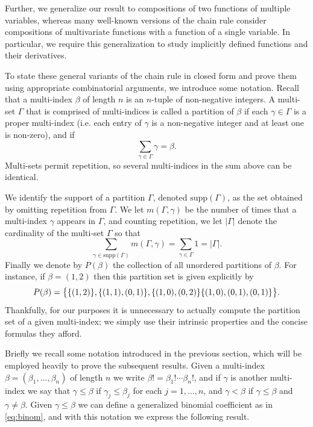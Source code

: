 \documentclass[oneside,hidelinks,indentfirst,10pt]{book}
\begin{document}
Further, we generalize our result to compositions of two functions of multiple variables, whereas many well-known versions of the chain rule consider compositions of multivariate functions with a function of a single variable. In particular, we require this generalization to study implicitly defined functions and their derivatives. 


To state these general variants of the chain rule in closed form and prove them using appropriate combinatorial arguments, we introduce some notation. Recall that a multi-index \(\beta\) of length \(n\) is an \(n\)-tuple of non-negative integers. A multi-set \(\Gamma\) that is comprised of multi-indices is called a partition of \(\beta\) if each \(\gamma\in\Gamma\) is a proper multi-index (i.e. each entry of \(\gamma\) is a non-negative integer and at least one is non-zero), and if
\[
    \sum_{\gamma\in\Gamma}\gamma=\beta.
\]
Multi-sets permit repetition, so several multi-indices in the sum above can be identical. 

We identify the support of a partition \(\Gamma\), denoted \(\mathrm{supp}(\Gamma)\), as the set obtained by omitting repetition from \(\Gamma\). We let \(m(\Gamma,\gamma)\) be the number of times that a multi-index \(\gamma\) appears in \(\Gamma\), and counting repetition, we let \(|\Gamma|\) denote the cardinality of the multi-set \(\Gamma\) so that
\[
    \sum_{\gamma\in\mathrm{supp}(\Gamma)}m(\Gamma,\gamma)=\sum_{\gamma\in\Gamma}1=|\Gamma|.
\]
Finally we denote by \(P(\beta)\) the collection of all unordered partitions of \(\beta\). For instance, if \(\beta=(1,2)\) then this partition set is given explicitly by
\[
    P(\beta)=\big\{\{(1,2)\},\{(1,1),(0,1)\},\{(1,0),(0,2)\}\\
    \{(1,0),(0,1),(0,1)\}
    \big\}.
\]
Thankfully, for our purposes it is unnecessary to actually compute the partition set of a given multi-index; we simply use their intrinsic properties and the concise formulas they afford.


Briefly we recall some notation introduced in the previous section, which will be employed heavily to prove the subsequent results. Given a multi-index \(\beta=(\beta_1,\dots,\beta_n)\) of length \(n\) we write \(\beta!=\beta_1!\cdots\beta_n!\), and if \(\gamma\) is another multi-index we say that \(\gamma\leq\beta\) if \(\gamma_j\leq\beta_j\) for each \(j=1,\dots,n\), and \(\gamma<\beta\) if \(\gamma\leq\beta\) and \(\gamma\neq\beta\). Given \(\gamma\leq\beta\) we can define a generalized binomial coefficient as in \eqref{eq:binom}, and with this notation we express the following result.
\end{document}
